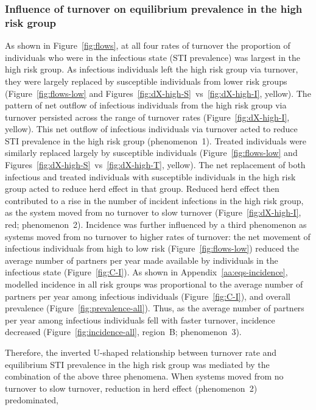 \subsubsection{Influence of turnover on equilibrium prevalence in the high risk group}
\label{sss:res-prev-high}
As shown in Figure~\ref{fig:flows}, at all four rates of turnover
the proportion of individuals who were in the infectious state (STI prevalence)
was largest in the high risk group.
As infectious individuals left the high risk group via turnover,
they were largely replaced by susceptible individuals from lower risk groups
(Figure~\ref{fig:flows-low} and
Figures~\ref{fig:dX-high-S}~vs~\ref{fig:dX-high-I}, yellow).
The pattern of net outflow of infectious individuals
from the high risk group via turnover
persisted across the range of turnover rates
(Figure~\ref{fig:dX-high-I}, yellow).
This net outflow of infectious individuals via turnover
acted to reduce STI prevalence in the high risk group
(phenomenon~1).
Treated individuals were similarly replaced largely by susceptible individuals
(Figure~\ref{fig:flows-low} and
Figures~\ref{fig:dX-high-S}~vs~\ref{fig:dX-high-T}, yellow).
The net replacement of both infectious and treated individuals with susceptible individuals
in the high risk group acted to reduce herd effect in that group.
Reduced herd effect then contributed to a rise in
the number of incident infections in the high risk group,
as the system moved from no turnover to slow turnover
(Figure~\ref{fig:dX-high-I}, red; phenomenon~2).
Incidence was further influenced by a third phenomenon
as systems moved from no turnover to higher rates of turnover:
the net movement of infectious individuals
from high to low risk (Figure~\ref{fig:flows-low})
reduced the average number of partners per year made available by
individuals in the infectious state (Figure~\ref{fig:C-I}).
As shown in Appendix~\ref{aa:eqs-incidence},
modelled incidence in all risk groups was proportional to
the average number of partners per year among infectious individuals
(Figure~\ref{fig:C-I}),
and overall prevalence
(Figure~\ref{fig:prevalence-all}).
Thus, as the average number of partners per year among infectious individuals
fell with faster turnover, incidence decreased
(Figure~\ref{fig:incidence-all}, region~B; phenomenon~3).
\par
Therefore, the inverted U-shaped relationship between turnover rate
and equilibrium STI prevalence in the high risk group was mediated
by the combination of the above three phenomena.
When systems moved from no turnover to slow turnover,
reduction in herd effect (phenomenon~2) predominated,
